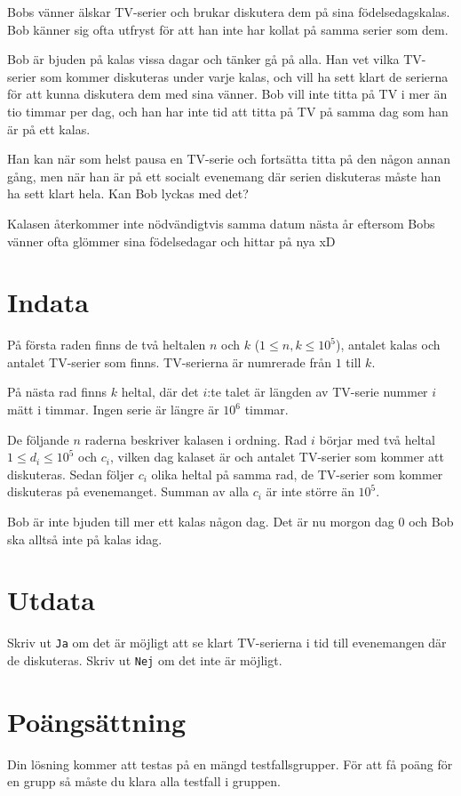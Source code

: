 Bobs vänner älskar TV-serier och brukar diskutera dem på sina födelsedagskalas. Bob känner sig ofta utfryst för att han inte har kollat på samma serier som dem.

Bob är bjuden på kalas vissa dagar och tänker gå på alla. Han vet vilka TV-serier som kommer diskuteras under varje kalas, och vill ha sett klart de serierna för att kunna diskutera dem med sina vänner. Bob vill inte titta på TV i mer än tio timmar per dag, och han har inte tid att titta på TV på samma dag som han är på ett kalas.

Han kan när som helst pausa en TV-serie och fortsätta titta på den någon annan gång, men när han är på ett socialt evenemang där serien diskuteras måste han ha sett klart hela. Kan Bob lyckas med det?

Kalasen återkommer inte nödvändigtvis samma datum nästa år eftersom Bobs vänner ofta glömmer sina födelsedagar och hittar på nya xD

\section*{Indata}
På första raden finns de två heltalen $n$ och $k$ ($1 \leq n,k \leq 10^5$), antalet kalas och antalet TV-serier som finns. TV-serierna är numrerade från $1$ till $k$.

På nästa rad finns $k$ heltal, där det $i$:te talet är längden av TV-serie nummer $i$ mätt i timmar. Ingen serie är längre är $10^6$ timmar.

De följande $n$ raderna beskriver kalasen i ordning. Rad $i$ börjar med två heltal $1 \leq d_i \leq 10^5$ och $c_i$, vilken dag kalaset är och antalet TV-serier som kommer att diskuteras. Sedan följer $c_i$ olika heltal på samma rad, de TV-serier som kommer diskuteras på evenemanget. Summan av alla $c_i$ är inte större än $10^5$.

Bob är inte bjuden till mer ett kalas någon dag. Det är nu morgon dag $0$ och Bob ska alltså inte på kalas idag.

\section*{Utdata}
Skriv ut \texttt{Ja} om det är möjligt att se klart TV-serierna i tid till evenemangen där de diskuteras. Skriv ut \texttt{Nej} om det inte är möjligt.

\section*{Poängsättning}
Din lösning kommer att testas på en mängd testfallsgrupper.
För att få poäng för en grupp så måste du klara alla testfall i gruppen.


